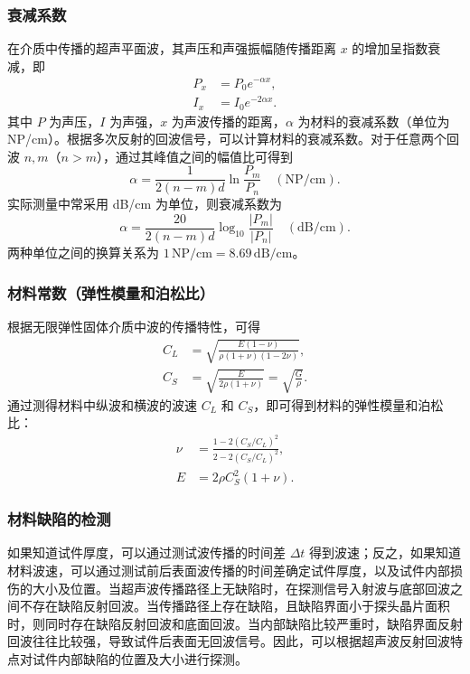 \documentclass[UTF8,a4paper,12pt]{ctexart}
\numberwithin{equation}{section}
\begin{document}
\subsubsection{衰减系数}
在介质中传播的超声平面波，其声压和声强振幅随传播距离 $x$ 的增加呈指数衰减，即
\begin{subequations}
\begin{align}
  P_x&=P_0e^{-\alpha x},\\
  I_x&=I_0e^{-2\alpha x}.
\end{align}
\end{subequations}
其中 $P$ 为声压，$I$ 为声强，$x$ 为声波传播的距离，$\alpha$ 为材料的衰减系数（单位为 NP/cm）。根据多次反射的回波信号，可以计算材料的衰减系数。对于任意两个回波 $n,m$（$n>m$），通过其峰值之间的幅值比可得到
\begin{equation}
  \alpha=\frac{1}{2(n-m)d}\ln\frac{P_m}{P_n}\quad(\mathrm{NP/cm}).
\end{equation}
实际测量中常采用 dB/cm 为单位，则衰减系数为
\begin{equation}
  \alpha=\frac{20}{2(n-m)d}\log_{10}\frac{|P_m|}{|P_n|}\quad(\mathrm{dB/cm}).
  \label{eq:exp2-attenuation}
\end{equation}
两种单位之间的换算关系为 $1\,\mathrm{NP/cm}=8.69\,\mathrm{dB/cm}$。

\subsubsection{材料常数（弹性模量和泊松比）}
根据无限弹性固体介质中波的传播特性，可得
\begin{subequations}
\begin{align}
  C_L&=\sqrt{\frac{E(1-\nu)}{\rho(1+\nu)(1-2\nu)}},\\
  C_S&=\sqrt{\frac{E}{2\rho(1+\nu)}}=\sqrt{\frac{G}{\rho}}.
\end{align}
\end{subequations}
通过测得材料中纵波和横波的波速 $C_L$ 和 $C_S$，即可得到材料的弹性模量和泊松比：
\begin{subequations}
\begin{align}
  \nu&=\frac{1-2(C_S/C_L)^2}{2-2(C_S/C_L)^2},\\
  E&=2\rho C_S^2(1+\nu).
  \label{eq:exp2-E}
\end{align}
\end{subequations}

\subsubsection{材料缺陷的检测}
如果知道试件厚度，可以通过测试波传播的时间差 $\Delta t$ 得到波速；反之，如果知道材料波速，可以通过测试前后表面波传播的时间差确定试件厚度，以及试件内部损伤的大小及位置。当超声波传播路径上无缺陷时，在探测信号入射波与底部回波之间不存在缺陷反射回波。当传播路径上存在缺陷，且缺陷界面小于探头晶片面积时，则同时存在缺陷反射回波和底面回波。当内部缺陷比较严重时，缺陷界面反射回波往往比较强，导致试件后表面无回波信号。因此，可以根据超声波反射回波特点对试件内部缺陷的位置及大小进行探测。
\end{document}
